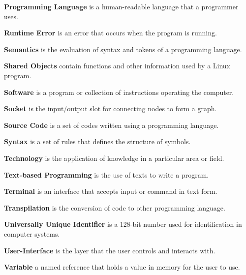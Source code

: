 \parx
\textbf{Programming Language} is a human-readable language that a programmer uses.

\parx
\textbf{Runtime Error} is an error that occurs when the program is running.

\parx
\textbf{Semantics} is the evaluation of syntax and tokens of a programming language.

\parx
\textbf{Shared Objects} contain functions and other information used by a Linux program.

\parx
\textbf{Software} is a program or collection of instructions operating the computer.

\parx
\textbf{Socket} is the input/output slot for connecting nodes to form a graph.

\parx
\textbf{Source Code} is a set of codes written using a programming language.

\parx
\textbf{Syntax} is a set of rules that defines the structure of symbols.

\parx
\textbf{Technology} is the application of knowledge in a particular area or field.

\parx
\textbf{Text-based Programming} is the use of texts to write a program.

\parx
\textbf{Terminal} is an interface that accepts input or command in text form.

\parx
\textbf{Transpilation} is the conversion of code to other programming language.

\parx
\textbf{Universally Unique Identifier} is a 128-bit number used for identification in computer systems.

\parx
\textbf{User-Interface} is the layer that the user controls and interacts with.

\parx
\textbf{Variable} a named reference that holds a value in memory for the user to use.
